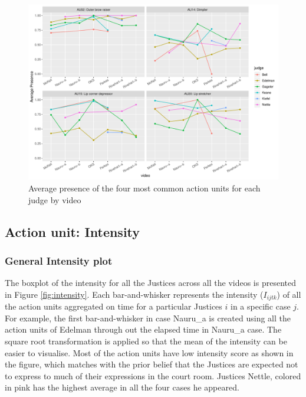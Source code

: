 \documentclass{monashthesis}
\begin{document}
\begin{figure}

{\centering \includegraphics[width=1\linewidth]{figures/au-video-1} 

}

\caption{Average presence of the four most common action units for each judge by video\label{fig:common_video}}\label{fig:au-video}
\end{figure}

\hypertarget{action-unit-intensity}{%
\subsection{Action unit: Intensity}\label{action-unit-intensity}}

\hypertarget{general-intensity-plot}{%
\subsubsection{General Intensity plot}\label{general-intensity-plot}}

The boxplot of the intensity for all the Justices across all the videos is presented in Figure \ref{fig:intensity}. Each bar-and-whisker represents the intensity (\(I_{ijtk}\)) of all the action units aggregated on time for a particular Justices \(i\) in a specific case \(j\). For example, the first bar-and-whisker in case Nauru\_a is created using all the action units of Edelman through out the elapsed time in Nauru\_a case. The square root transformation is applied so that the mean of the intensity can be easier to visualise. Most of the action units have low intensity score as shown in the figure, which matches with the prior belief that the Justices are expected not to express to much of their expressions in the court room. Justices Nettle, colored in pink has the highest average in all the four cases he appeared.
\end{document}
